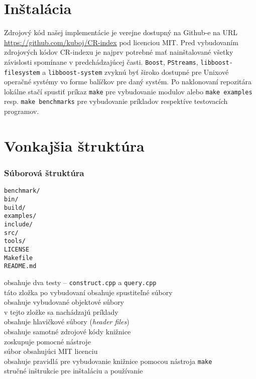 \section{Inštalácia}
Zdrojový kód našej implementácie je verejne dostupný na Github-e na URL \url{https://github.com/kuboj/CR-index} pod licenciou MIT. Pred vybudovaním zdrojových kódov CR-indexu je najprv potrebné mať nainštalované všetky závislosti spomínane v predchádzajúcej časti. \texttt{Boost}, \texttt{PStreams}, \texttt{libboost-filesystem} a \texttt{libboost-system} zvyknú byť široko dostupné pre Unixové operačné systémy vo forme balíčkov pre daný systém. Po naklonovaní repozitára lokálne stačí spustiť príkaz \texttt{make} pre vybudovanie modulov alebo \texttt{make examples} resp. \texttt{make benchmarks} pre vybudovanie príkladov respektíve testovacích programov.

\section{Vonkajšia štruktúra}
\label{sec:vonkajsia_struktura}

\subsubsection{Súborová štruktúra}

\begin{minipage}[t]{0.20\linewidth}
    \vspace{0pt}
    \texttt{benchmark/} \\
    \texttt{bin/} \\
    \texttt{build/} \\
    \texttt{examples/}  \\
    \texttt{include/}   \\
    \texttt{src/}       \\
    \texttt{tools/}     \\
    \texttt{LICENSE}     \\
    \texttt{Makefile}     \\
    \texttt{README.md}
\end{minipage}
\hspace{0.3cm}
\begin{minipage}[t]{0.8\linewidth}
    \vspace{0pt}
    obsahuje dva testy -- \texttt{construct.cpp} a \texttt{query.cpp} \\
    táto zložka po vybudovaní obsahuje spustiteľné súbory \\
    obsahuje vybudované objektové súbory \\
    v tejto zložke sa nachádzajú príklady \\
    obsahuje hlavičkové súbory (\emph{header files}) \\
    obsahuje samotné zdrojové kódy knižnice \\
    zoskupuje pomocné nástroje \\
    súbor obsahujúci MIT licenciu \\
    obsahuje pravidlá pre vybudovanie knižnice pomocou nástroja \texttt{make} \\
    stručné inštrukcie pre inštaláciu a používanie
\end{minipage}

